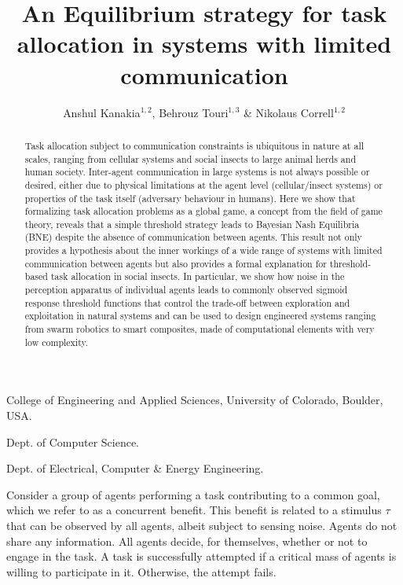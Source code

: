 \documentclass{nature}
\title{An Equilibrium strategy for task allocation in systems with limited communication}
\author{Anshul Kanakia$^{1,2}$, Behrouz Touri$^{1,3}$ \& Nikolaus Correll$^{1,2}$}
\begin{document}
\maketitle
\begin{affiliations}
 \item College of Engineering and Applied Sciences, University of Colorado, Boulder, USA. 
 \item Dept. of Computer Science.
 \item Dept. of Electrical, Computer \& Energy Engineering.
\end{affiliations}

\linenumbers
\begin{abstract}
Task allocation subject to communication constraints is ubiquitous in nature at all scales, ranging from cellular systems\cite{Yoshida2010, Suzuki2015} and social insects\cite{Robinson1987, Gordon1996, Bonabeau1998, Theraulaz1998} to large animal herds\cite{Conradt2003, Conradt2005} and human society\cite{Raafat2009}. Inter-agent communication in large systems is not always possible or desired, either due to physical limitations at the agent level (cellular/insect systems) or properties of the task itself (adversary behaviour in humans). Here we show that formalizing task allocation problems as a global game, a concept from the field of game theory, reveals that a simple threshold strategy leads to Bayesian Nash Equilibria (BNE) despite the absence of communication between agents. This result not only provides a hypothesis about the inner workings of a wide range of systems with limited communication between agents but also provides a formal explanation for threshold-based task allocation in social insects. In particular, we show how noise in the perception apparatus of individual agents leads to commonly observed sigmoid response threshold functions that control the trade-off between exploration and exploitation\cite{Bonabeau1997} in natural systems and can be used to design engineered systems ranging from swarm robotics\cite{Martinoli1999, Krieger2000, Kube2000, Mataric2003, Gerkey2004} to smart composites\cite{McEvoy2015}, made of computational elements with very low complexity. 
\end{abstract}

Consider a group of agents performing a task contributing to a common goal, which we refer to as a concurrent benefit. This benefit is related to a stimulus $\tau$ that can be observed by all agents, albeit subject to sensing noise. Agents do not share any information. All agents decide, for themselves, whether or not to engage in the task. A task is successfully attempted if a critical mass of agents is willing to participate in it. Otherwise, the attempt fails.
\end{document}
